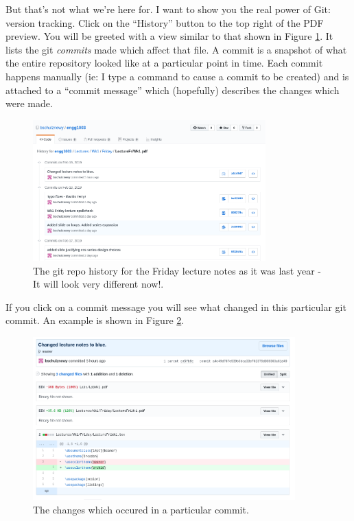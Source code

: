 \documentclass{lab}
\begin{document}
But that's not what we're here for. I want to show you the real power of Git: version tracking. Click on the ``History'' button to the top right of the PDF preview. You will be greeted with a view similar to that shown in Figure \ref{fig:githistory}. It lists the git \textit{commits} made which affect that file. A commit is a snapshot of what the entire repository looked like at a particular point in time. Each commit happens manually (ie: I type a command to cause a commit to be created) and is attached to a ``commit message'' which (hopefully) describes the changes which were made.

\begin{figure}[H]
\begin{center}
\includegraphics[width=0.8\textwidth]{Wk1Images/github_lecture.png}
\end{center}
\caption{The git repo history for the Friday lecture notes as it was last year - It will look very different now!.}\label{fig:githistory}
\end{figure}

If you click on a commit message you will see what changed in this particular git commit. An example is shown in Figure \ref{fig:gitchanges}.

\begin{figure}[H]
\begin{center}
\includegraphics[width=0.9\textwidth]{Wk1Images/github_lecture_changes.png}
\end{center}
\caption{The changes which occured in a particular commit.}\label{fig:gitchanges}
\end{figure}
\end{document}
